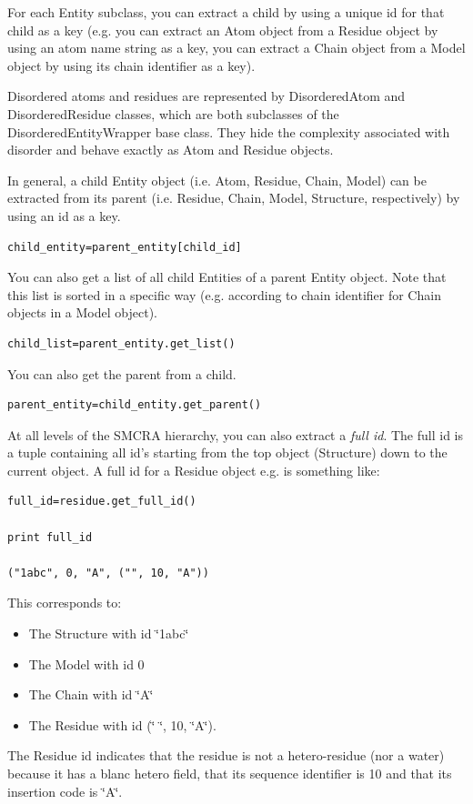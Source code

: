 \documentclass{report}
\begin{document}
For each Entity subclass, you can extract a child by using a unique id for that
child as a key (e.g. you can extract an Atom object from a Residue object by
using an atom name string as a key, you can extract a Chain object from a Model
object by using its chain identifier as a key).

Disordered atoms and residues are represented by DisorderedAtom and DisorderedResidue
classes, which are both subclasses of the DisorderedEntityWrapper base class.
They hide the complexity associated with disorder and behave exactly as Atom
and Residue objects.

In general, a child Entity object (i.e. Atom, Residue, Chain, Model) can be
extracted from its parent (i.e. Residue, Chain, Model, Structure, respectively)
by using an id as a key.

\begin{verbatim}
child_entity=parent_entity[child_id]
\end{verbatim}

You can also get a list of all child Entities of a parent Entity object. Note
that this list is sorted in a specific way (e.g. according to chain identifier
for Chain objects in a Model object).

\begin{verbatim}
child_list=parent_entity.get_list()
\end{verbatim}

You can also get the parent from a child.

\begin{verbatim}
parent_entity=child_entity.get_parent()
\end{verbatim}

At all levels of the SMCRA hierarchy, you can also extract a \emph{full id}.
The full id is a tuple containing all id's starting from the top object (Structure)
down to the current object. A full id for a Residue object e.g. is something
like:

\begin{verbatim}
full_id=residue.get_full_id()

print full_id

("1abc", 0, "A", ("", 10, "A"))
\end{verbatim}

This corresponds to:

\begin{itemize}
\item The Structure with id \char`\"{}1abc\char`\"{}
\item The Model with id 0
\item The Chain with id \char`\"{}A\char`\"{}
\item The Residue with id (\char`\"{} \char`\"{}, 10, \char`\"{}A\char`\"{}).
\end{itemize}
The Residue id indicates that the residue is not a hetero-residue (nor a water)
because it has a blanc hetero field, that its sequence identifier is 10 and
that its insertion code is \char`\"{}A\char`\"{}.
\end{document}
